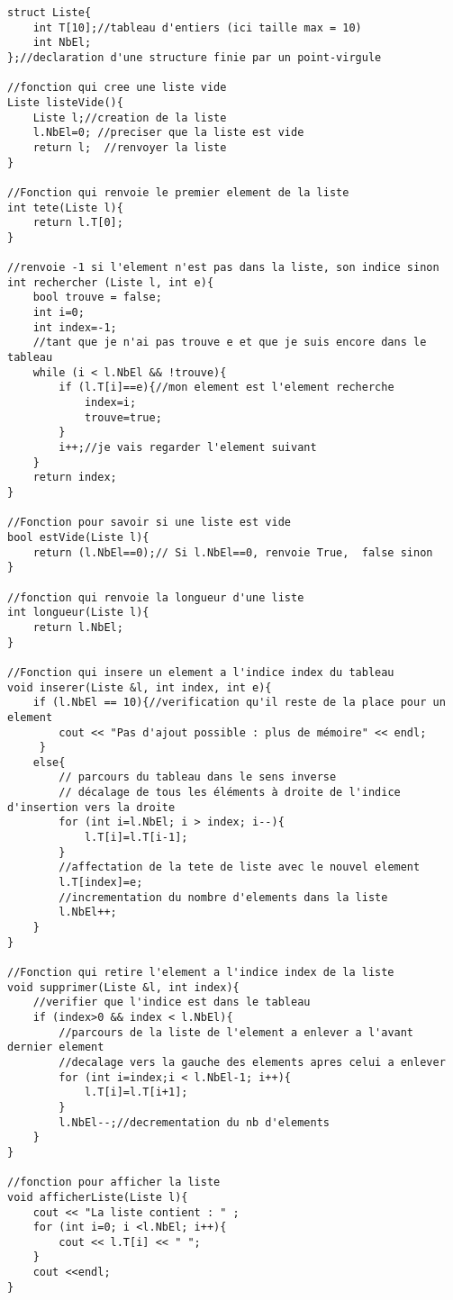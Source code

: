 \documentclass[french]{article}
\begin{document}
	\begin{lstlisting}
struct Liste{
    int T[10];//tableau d'entiers (ici taille max = 10)
    int NbEl;
};//declaration d'une structure finie par un point-virgule

//fonction qui cree une liste vide 
Liste listeVide(){
    Liste l;//creation de la liste
    l.NbEl=0; //preciser que la liste est vide
    return l;  //renvoyer la liste
}

//Fonction qui renvoie le premier element de la liste
int tete(Liste l){
    return l.T[0];
}

//renvoie -1 si l'element n'est pas dans la liste, son indice sinon
int rechercher (Liste l, int e){
    bool trouve = false;
    int i=0;
    int index=-1;
    //tant que je n'ai pas trouve e et que je suis encore dans le tableau
    while (i < l.NbEl && !trouve){
        if (l.T[i]==e){//mon element est l'element recherche
 	   	    index=i;
 	   	    trouve=true;
        }
        i++;//je vais regarder l'element suivant
    }
    return index;
}

//Fonction pour savoir si une liste est vide
bool estVide(Liste l){
    return (l.NbEl==0);// Si l.NbEl==0, renvoie True,  false sinon
}

//fonction qui renvoie la longueur d'une liste
int longueur(Liste l){
    return l.NbEl;
}

//Fonction qui insere un element a l'indice index du tableau
void inserer(Liste &l, int index, int e){
    if (l.NbEl == 10){//verification qu'il reste de la place pour un element
        cout << "Pas d'ajout possible : plus de mémoire" << endl;
     }
    else{
        // parcours du tableau dans le sens inverse 
        // décalage de tous les éléments à droite de l'indice d'insertion vers la droite
        for (int i=l.NbEl; i > index; i--){
            l.T[i]=l.T[i-1];
        }
        //affectation de la tete de liste avec le nouvel element
        l.T[index]=e;
        //incrementation du nombre d'elements dans la liste
        l.NbEl++;
    }
}

//Fonction qui retire l'element a l'indice index de la liste
void supprimer(Liste &l, int index){
    //verifier que l'indice est dans le tableau
    if (index>0 && index < l.NbEl){
        //parcours de la liste de l'element a enlever a l'avant dernier element
        //decalage vers la gauche des elements apres celui a enlever
        for (int i=index;i < l.NbEl-1; i++){
            l.T[i]=l.T[i+1];
        }	    
        l.NbEl--;//decrementation du nb d'elements
    }
}

//fonction pour afficher la liste
void afficherListe(Liste l){
    cout << "La liste contient : " ;
    for (int i=0; i <l.NbEl; i++){
        cout << l.T[i] << " ";
    }
    cout <<endl;
}
	\end{lstlisting}
	
\end{document}
